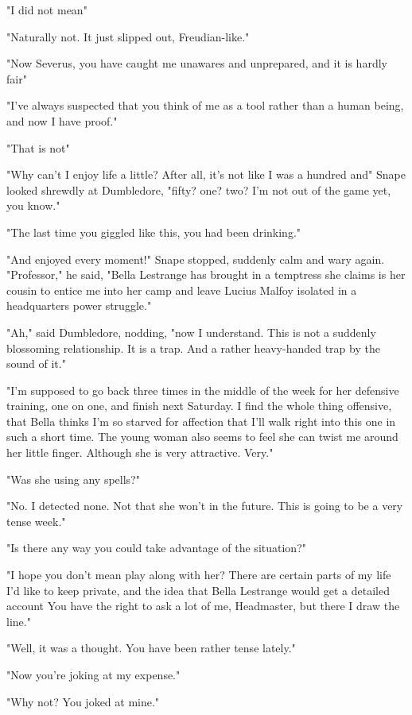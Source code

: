 "I did not mean{\el}"

"Naturally not. It just slipped out, Freudian-like."

"Now Severus, you have caught me unawares and unprepared, and it is hardly fair{\el}"

"I've always suspected that you think of me as a tool rather than a human being, and now I have proof."

"That is not{\el}"

"Why can't I enjoy life a little? After all, it's not like I was a hundred and{\el}" Snape looked shrewdly at Dumbledore, "fifty? {\el}one? {\el}two? I'm not out of the game yet, you know."

"The last time you giggled like this, you had been drinking."

"And enjoyed every moment!" Snape stopped, suddenly calm and wary again. "Professor," he said, "Bella Lestrange has brought in a temptress she claims is her cousin to entice me into her camp and leave Lucius Malfoy isolated in a headquarters power struggle."

"Ah," said Dumbledore, nodding, "now I understand. This is not a suddenly blossoming relationship. It is a trap. And a rather heavy-handed trap by the sound of it."

"I'm supposed to go back three times in the middle of the week for her defensive training, one on one, and finish next Saturday. I find the whole thing offensive, that Bella thinks I'm so starved for affection that I'll walk right into this one in such a short time. The young woman also seems to feel she can twist me around her little finger. Although she is very attractive. Very."

"Was she using any spells?"

"No. I detected none. Not that she won't in the future. This is going to be a very tense week."

"Is there any way you could take advantage of the situation?"

"I hope you don't mean play along with her? There are certain parts of my life I'd like to keep private, and the idea that Bella Lestrange would get a detailed account{\el} You have the right to ask a lot of me, Headmaster, but there I draw the line."

"Well, it was a thought. You have been rather tense lately."

"Now you're joking at my expense."

"Why not? You joked at mine."

